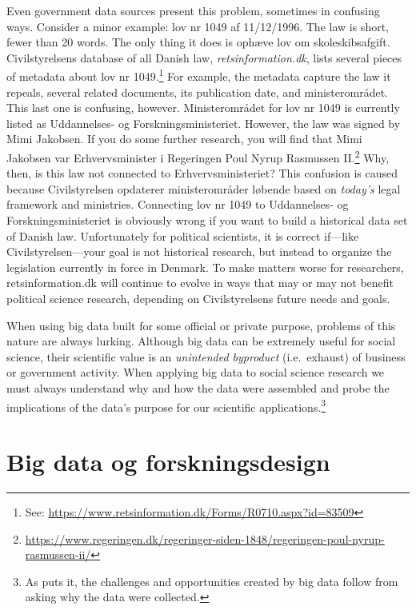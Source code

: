 \documentclass[12pt,]{article}
\begin{document}
Even government data sources present this problem, sometimes in
confusing ways. Consider a minor example: lov nr 1049 af 11/12/1996. The
law is short, fewer than 20 words. The only thing it does is ophæve lov
om skoleskibsafgift. Civilstyrelsens database of all Danish law,
\emph{retsinformation.dk}, lists several pieces of metadata about lov nr
1049.\footnote{See:
  \url{https://www.retsinformation.dk/Forms/R0710.aspx?id=83509}} For
example, the metadata capture the law it repeals, several related
documents, its publication date, and ministerområdet. This last one is
confusing, however. Ministerområdet for lov nr 1049 is currently listed
as Uddannelses- og Forskningsministeriet. However, the law was signed by
Mimi Jakobsen. If you do some further research, you will find that Mimi
Jakobsen var Erhvervsminister i Regeringen Poul Nyrup Rasmussen
II.\footnote{\url{https://www.regeringen.dk/regeringer-siden-1848/regeringen-poul-nyrup-rasmussen-ii/}}
Why, then, is this law not connected to Erhvervsministeriet? This
confusion is caused because Civilstyrelsen opdaterer ministerområder
løbende based on \emph{today's} legal framework and ministries.
Connecting lov nr 1049 to Uddannelses- og Forskningsministeriet is
obviously wrong if you want to build a historical data set of Danish
law. Unfortunately for political scientists, it is correct if---like
Civilstyrelsen---your goal is not historical research, but instead to
organize the legislation currently in force in Denmark. To make matters
worse for researchers, retsinformation.dk will continue to evolve in
ways that may or may not benefit political science research, depending
on Civilstyrelsens future needs and goals.

When using big data built for some official or private purpose, problems
of this nature are always lurking. Although big data can be extremely
useful for social science, their scientific value is an \emph{unintended
byproduct} (i.e.~exhaust) of business or government activity. When
applying big data to social science research we must always understand
why and how the data were assembled and probe the implications of the
data's purpose for our scientific applications.\footnote{As
  \citet{salganik17} puts it, the challenges and opportunities created
  by big data follow from asking why the data were collected.}

\hypertarget{big-data-og-forskningsdesign}{%
\section{Big data og
forskningsdesign}\label{big-data-og-forskningsdesign}}
\end{document}
